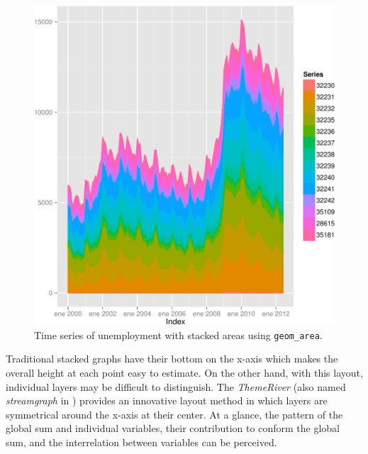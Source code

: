 \documentclass[smallroyalvopaper]{memoir}
\begin{document}
\begin{figure}[htbp]
\centering
\includegraphics[width=.9\linewidth]{figs/unemployUSAgeomArea.pdf}
\caption{Time series of unemployment with stacked areas using \texttt{geom\_area}. \label{fig:unemployUSAgeomArea}}
\end{figure}

Traditional stacked graphs have their bottom on the x-axis which makes
the overall height at each point easy to estimate. On the other hand,
with this layout, individual layers may be difficult to
distinguish. The \emph{ThemeRiver} \cite{Havre.Hetzler.ea2002} (also named
\emph{streamgraph} in \cite{Byron.Wattenberg2008}) provides an innovative
layout method in which layers are symmetrical around the x-axis at
their center. At a glance, the pattern of the global sum and
individual variables, their contribution to conform the global sum,
and the interrelation between variables can be perceived.
\end{document}
